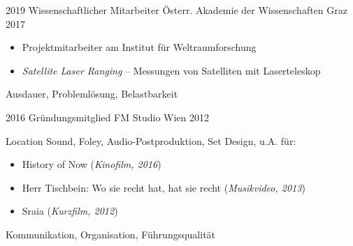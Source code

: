 \begin{experiences}
	\experience
	{2019}
	{Wissenschaftlicher Mitarbeiter}
	{Österr. Akademie der Wissenschaften}
	{Graz}
	{2017}
	{
		\begin{itemize}
			\item Projektmitarbeiter am Institut für Weltraumforschung
			\item \textit{Satellite Laser Ranging} –
			      Messungen von Satelliten mit Laserteleskop
		\end{itemize}
		\smallskip
	}
	{Ausdauer, Problemlösung, Belastbarkeit}

	\emptySeparator

	\experience
	{2016}
	{Gründungsmitglied}
	{FM Studio}
	{Wien}
	{2012}
	{
		Location Sound, Foley, Audio-Postproduktion, Set Design, u.A. für:
		\begin{itemize}
			\item History of Now
			      (\textit{Kinofilm, 2016})
			\item Herr Tischbein: Wo sie recht hat, hat sie recht
			      (\textit{Musikvideo, 2013})
			\item Sraia
			      (\textit{Kurzfilm, 2012})
		\end{itemize}
		\smallskip
	}
	{Kommunikation, Organisation, Führungsqualität}
\end{experiences}